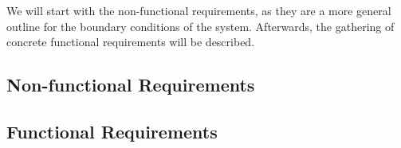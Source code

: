We will start with the non-functional requirements, as they are a more general outline for the boundary conditions of the system.
Afterwards, the gathering of concrete functional requirements will be described.

\subsection{\label{sec::Non-functionalRequirements}Non-functional Requirements}

\subsection{\label{sec::FunctionalRequirements}Functional Requirements}
